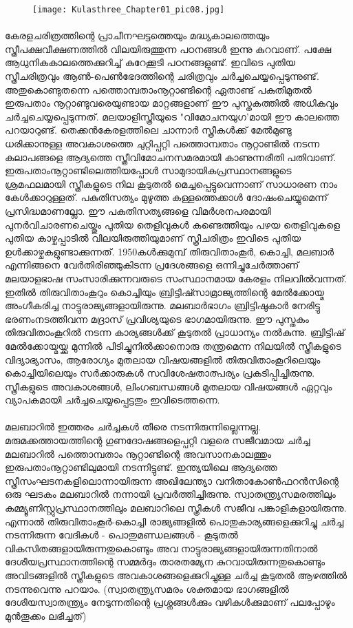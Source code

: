 \begin{figure}[h]
\begin{center}
\texttt{[image: Kulasthree\_Chapter01\_pic08.jpg]}
\end{center}
\end{figure}

\paragraph{}	കേരളചരിത്രത്തിന്റെ പ്രാചീനഘട്ടത്തെയും മദ്ധ്യകാലത്തെയും സ്ത്രീപക്ഷവീക്ഷണത്തിൽ വിലയിരുത്തുന്ന പഠനങ്ങൾ ഇന്നു കുറവാണ്. പക്ഷേ ആധുനികകാലത്തെക്കുറിച്ച് കുറേക്കൂടി പഠനങ്ങളുണ്ട്. ഇവിടെ പുതിയ സ്ത്രീചരിത്രവും ആൺ-പെൺഭേദത്തിന്റെ ചരിത്രവും ചർച്ചചെയ്യപ്പെടുന്നുണ്ട്. അതുകൊണ്ടുതന്നെ പത്തൊമ്പതാംനൂറ്റാണ്ടിന്റെ ഏതാണ്ട് പകുതിമുതൽ ഇരുപതാം നൂറ്റാണ്ടുവരെയുണ്ടായ മാറ്റങ്ങളാണ് ഈ പുസ്തകത്തിൽ അധികവും ചർച്ചചെയ്യപ്പെടുന്നത്. മലയാളിസ്ത്രീയുടെ "വിമോചനയുഗ'മായി ഈ കാലത്തെ പറയാറുണ്ട്. തെക്കൻകേരളത്തിലെ ചാന്നാർ സ്ത്രീകൾക്ക് മേൽമുണ്ടു ധരിക്കാനുള്ള അവകാശത്തെ ചുറ്റിപ്പറ്റി പത്തൊമ്പതാം നൂറ്റാണ്ടിൽ നടന്ന കലാപങ്ങളെ ആദ്യത്തെ സ്ത്രീവിമോചനസമരമായി കാണുന്നരീതി പതിവാണ്. ഇരുപതാംനൂറ്റാണ്ടിലെത്തിയപ്പോൾ സാമുദായികപ്രസ്ഥാനങ്ങളുടെ ശ്രമഫലമായി സ്ത്രീകളുടെ നില കൂടുതൽ മെച്ചപ്പെട്ടുവെന്നാണ് സാധാരണ നാം കേൾക്കാറുള്ളത്. പകുതിസത്യം മുഴുത്ത കള്ളത്തെക്കാൾ ദോഷംചെയ്യുമെന്ന് പ്രസിദ്ധമാണല്ലോ. ഈ പകുതിസത്യങ്ങളെ വിമർശനപരമായി പുനർവിചാരണചെയ്തും പുതിയ തെളിവുകൾ കണ്ടെത്തിയും പഴയ തെളിവുകളെ പുതിയ കാഴ്ചപ്പാടിൽ വിലയിരുത്തിയുമാണ് സ്ത്രീചരിത്രം ഇവിടെ പുതിയ ഉൾക്കാഴ്ചകളുണ്ടാക്കുന്നത്. 1950കൾക്കുമുമ്പ് തിരുവിതാംകൂർ, കൊച്ചി, മലബാർ എന്നിങ്ങനെ വേർതിരിഞ്ഞുകിടന്ന പ്രദേശങ്ങളെ ഒന്നിച്ചുചേർത്താണ് മലയാളഭാഷ സംസാരിക്കുന്നവരുടെ സംസ്ഥാനമായ കേരളം നിലവിൽവന്നത്. ഇതിൽ തിരുവിതാംകൂറും കൊച്ചിയും ബ്രിട്ടിഷ്സാമ്രാജ്യത്തിന്റെ മേൽക്കോയ്മ അംഗീകരിച്ച നാട്ടുരാജ്യങ്ങളായിരുന്നു. മലബാർഭാഗം ബ്രിട്ടിഷുകാർ നേരിട്ടു ഭരണംനടത്തിവന്ന മദ്രാസ് പ്രവിശ്യയുടെ ഭാഗമായിരുന്നു. ഈ പുസ്തകം തിരുവിതാംകൂറിൽ നടന്ന കാര്യങ്ങൾക്ക് കൂടുതൽ പ്രാധാന്യം നൽകുന്നു. ബ്രിട്ടിഷ് മേൽക്കോയ്മയ്ക്കു മുന്നിൽ പിടിച്ചുനിൽക്കാനൊരു തന്ത്രമെന്ന നിലയിൽ സ്ത്രീകളുടെ വിദ്യാഭ്യാസം, ആരോഗ്യം മുതലായ വിഷയങ്ങളിൽ തിരുവിതാംകൂറിലെയും കൊച്ചിയിലെയും സർക്കാരുകൾ സവിശേഷതാത്പര്യം പ്രകടിപ്പിച്ചിരുന്നു. സ്ത്രീകളുടെ അവകാശങ്ങൾ, ലിംഗബന്ധങ്ങൾ മുതലായ വിഷയങ്ങൾ ഏറ്റവും വ്യാപകമായി ചർച്ചചെയ്യപ്പെട്ടതും ഇവിടെത്തന്നെ.

\paragraph{}	മലബാറിൽ ഇത്തരം ചർച്ചകൾ തീരെ നടന്നിരുന്നില്ലെന്നല്ല. മരുമക്കത്തായത്തിന്റെ ഗുണദോഷങ്ങളെപ്പറ്റി വളരെ സജീവമായ ചർച്ച മലബാറിൽ പത്തൊമ്പതാം നൂറ്റാണ്ടിന്റെ അവസാനകാലത്തും ഇരുപതാംനൂറ്റാണ്ടിലുമായി നടന്നിട്ടുണ്ട്. ഇന്ത്യയിലെ ആദ്യത്തെ സ്ത്രീസംഘടനകളിലൊന്നായിരുന്ന അഖിലേന്ത്യാ വനിതാകോൺഫറൻസിന്റെ ഒരു ഘടകം മലബാറിൽ നന്നായി പ്രവർത്തിച്ചിരുന്നു. സ്വാതന്ത്ര്യസമരത്തിലും കമ്മ്യൂണിസ്റ്റുപ്രസ്ഥാനത്തിലും മലബാറിലെ സ്ത്രീകൾ സജീവ പങ്കാളികളായിരുന്നു. എന്നാൽ തിരുവിതാംകൂർ-കൊച്ചി രാജ്യങ്ങളിൽ പൊതുകാര്യങ്ങളെക്കുറിച്ചു ചർച്ച നടന്നിരുന്ന വേദികൾ - പൊതുമണ്ഡലങ്ങൾ - കൂടുതൽ വികസിതങ്ങളായിരുന്നതുകൊണ്ടും അവ നാട്ടുരാജ്യങ്ങളായിരുന്നതിനാൽ ദേശീയപ്രസ്ഥാനത്തിന്റെ സമ്മർദ്ദം താരതമ്യേന കുറവായിരുന്നതുകൊണ്ടും അവിടങ്ങളിൽ സ്ത്രീകളുടെ അവകാശങ്ങളെക്കുറിച്ചുള്ള ചർച്ച കൂടുതൽ ആഴത്തിൽ നടന്നുവെന്നു പറയാം. (സ്വാതന്ത്ര്യസമരം ശക്തമായ ഭാഗങ്ങളിൽ ദേശീയസ്വാതന്ത്ര്യം നേടുന്നതിന്റെ പ്രശ്നങ്ങൾക്കും വഴികൾക്കുമാണ് പലപ്പോഴും മുൻതൂക്കം ലഭിച്ചത്)

